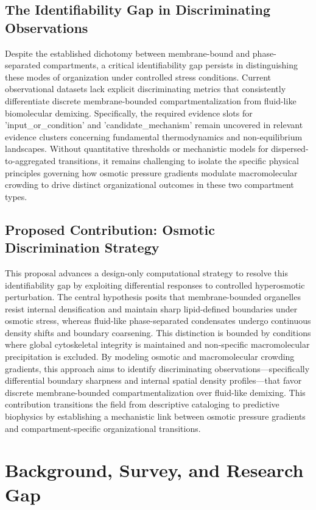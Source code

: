 \documentclass[conference]{IEEEtran}
\begin{document}
\subsection{The Identifiability Gap in Discriminating Observations}
Despite the established dichotomy between membrane-bound and phase-separated compartments, a critical identifiability gap persists in distinguishing these modes of organization under controlled stress conditions. Current observational datasets lack explicit discriminating metrics that consistently differentiate discrete membrane-bounded compartmentalization from fluid-like biomolecular demixing. Specifically, the required evidence slots for 'input\_or\_condition' and 'candidate\_mechanism' remain uncovered in relevant evidence clusters concerning fundamental thermodynamics and non-equilibrium landscapes. Without quantitative thresholds or mechanistic models for dispersed-to-aggregated transitions, it remains challenging to isolate the specific physical principles governing how osmotic pressure gradients modulate macromolecular crowding to drive distinct organizational outcomes in these two compartment types.

\subsection{Proposed Contribution: Osmotic Discrimination Strategy}
This proposal advances a design-only computational strategy to resolve this identifiability gap by exploiting differential responses to controlled hyperosmotic perturbation. The central hypothesis posits that membrane-bounded organelles resist internal densification and maintain sharp lipid-defined boundaries under osmotic stress, whereas fluid-like phase-separated condensates undergo continuous density shifts and boundary coarsening. This distinction is bounded by conditions where global cytoskeletal integrity is maintained and non-specific macromolecular precipitation is excluded. By modeling osmotic and macromolecular crowding gradients, this approach aims to identify discriminating observations---specifically differential boundary sharpness and internal spatial density profiles---that favor discrete membrane-bounded compartmentalization over fluid-like demixing. This contribution transitions the field from descriptive cataloging to predictive biophysics by establishing a mechanistic link between osmotic pressure gradients and compartment-specific organizational transitions.

\section{Background, Survey, and Research Gap}
\end{document}
